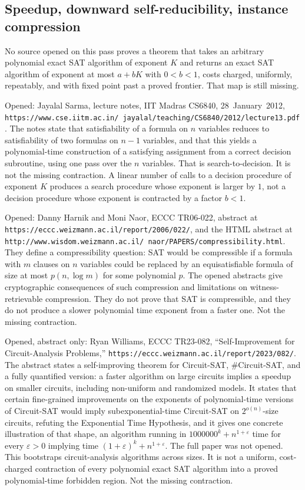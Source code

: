 \documentclass{article}
\begin{document}
\subsection{Speedup, downward self-reducibility, instance compression}
No source opened on this pass proves a theorem that takes an arbitrary polynomial exact SAT algorithm of exponent \(K\) and returns an exact SAT algorithm of exponent at most \(a+bK\) with \(0<b<1\), costs charged, uniformly, repeatably, and with fixed point past a proved frontier.
That map is still missing.

Opened: Jayalal Sarma, lecture notes, IIT Madras CS6840, 28~January~2012, \texttt{https://www.cse.iitm.ac.in/~jayalal/teaching/CS6840/2012/lecture13.pdf}.
The notes state that satisfiability of a formula on \(n\) variables reduces to satisfiability of two formulas on \(n-1\) variables, and that this yields a polynomial-time construction of a satisfying assignment from a correct decision subroutine, using one pass over the \(n\) variables.
That is search-to-decision.
It is not the missing contraction.
A linear number of calls to a decision procedure of exponent \(K\) produces a search procedure whose exponent is larger by \(1\), not a decision procedure whose exponent is contracted by a factor \(b<1\).

Opened: Danny Harnik and Moni Naor, ECCC TR06-022, abstract at \texttt{https://eccc.weizmann.ac.il/report/2006/022/}, and the HTML abstract at \texttt{http://www.wisdom.weizmann.ac.il/~naor/PAPERS/compressibility.html}.
They define a compressibility question: SAT would be compressible if a formula with \(m\) clauses on \(n\) variables could be replaced by an equisatisfiable formula of size at most \(p(n,\log m)\) for some polynomial \(p\).
The opened abstracts give cryptographic consequences of such compression and limitations on witness-retrievable compression.
They do not prove that SAT is compressible, and they do not produce a slower polynomial time exponent from a faster one.
Not the missing contraction.

Opened, abstract only: Ryan Williams, ECCC TR23-082, ``Self-Improvement for Circuit-Analysis Problems,'' \texttt{https://eccc.weizmann.ac.il/report/2023/082/}.
The abstract states a self-improving theorem for Circuit-SAT, \#Circuit-SAT, and a fully quantified version: a faster algorithm on large circuits implies a speedup on smaller circuits, including non-uniform and randomized models.
It states that certain fine-grained improvements on the exponents of polynomial-time versions of Circuit-SAT would imply subexponential-time Circuit-SAT on \(2^{o(n)}\)-size circuits, refuting the Exponential Time Hypothesis, and it gives one concrete illustration of that shape, an algorithm running in \(1000000^k+n^{1+\varepsilon}\) time for every \(\varepsilon>0\) implying time \((1+\varepsilon)^k+n^{1+\varepsilon}\).
The full paper was not opened.
This bootstraps circuit-analysis algorithms across sizes.
It is not a uniform, cost-charged contraction of every polynomial exact SAT algorithm into a proved polynomial-time forbidden region.
Not the missing contraction.
\end{document}
